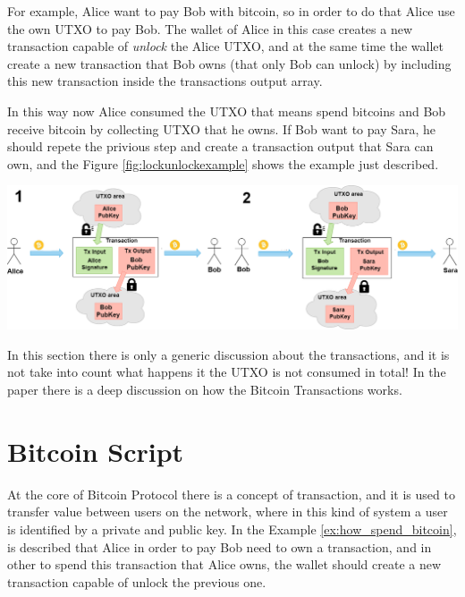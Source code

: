 \begin{example}
    \label{ex:how_spend_bitcoin}
    For example, Alice want to pay Bob with bitcoin, so in order to do that Alice
    use the own UTXO to pay Bob. The wallet of Alice in this case creates a new transaction
    capable of \emph{unlock} the Alice UTXO, and at the same time the wallet create 
    a new transaction that Bob owns (that only Bob can unlock) by including this new transaction inside the transactions output array. 

    In this way now Alice consumed the UTXO that means spend bitcoins and Bob receive bitcoin by collecting UTXO that he owns. 
    If Bob want to pay Sara, he should repete the privious step and create a transaction output that Sara can own,
    and the Figure \ref{fig:lockunlockexample} shows the example just described.

    {\centering
     \vspace{5pt}
      \includegraphics[scale=0.3]{imgs/DiagramUnlocLockUTXO.png}
      \vspace{10pt}
     \par}
\end{example}

In this section there is only a generic discussion about the transactions, and it is not take into count
what happens it the UTXO is not consumed in total! In the paper \cite{Palazzo_Estrazione_di_Informazioni_2021}
there is a deep discussion on how the Bitcoin Transactions works.

\section{Bitcoin Script}

At the core of Bitcoin Protocol there is a concept of transaction, and it is used to transfer value
between users on the network, where in this kind of system a user is identified by a private and public key.
In the Example \ref{ex:how_spend_bitcoin}, is described that Alice in order to pay Bob need to 
own a transaction, and in other to spend this transaction that Alice owns, the wallet should
create a new transaction capable of unlock the previous one. 

